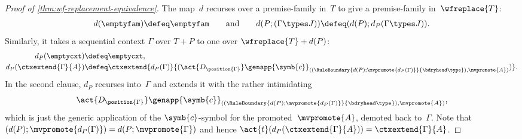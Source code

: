 \begin{proof}[Proof of \cref{thm:wf-replacement-equivalence}]
  The map~$d$ recurses over a premise-family in~$T$ to give a premise-family in~$\wfreplace{T}$:
  \begin{align*}
    d (\emptyfam) \defeq \emptyfam
    \qquad\text{and}\qquad
    d (P ; (\Gamma \types J)) \defeq (d(P) ; d_{P}(\Gamma \types J)).
  \end{align*}
  Similarly, it takes a sequential context $\Gamma$ over $T + P$ to one over $\wfreplace{T} + d(P)$:
  \begin{align*}
    d_P(\emptycxt) &\defeq \emptycxt, \\
    d_P(\ctxextend{\Gamma}{A}) &\defeq
    \ctxextend
      {d_P(\Gamma)}
      {(\act{{D_{\position{\Gamma}}}}
        \genapp{\symb{c}}_{((\RuleBoundary{d(P) ; \mvpromote{d_P(\Gamma)}}{\bdryhead \type}), \mvpromote{A})}
      )}.
  \end{align*}
  In the second clause, $d_P$ recurses into~$\Gamma$ and extends it with the rather intimidating
  \begin{equation*}
    \act{{D_{\position{\Gamma}}}}
        \genapp{\symb{c}}_{((\RuleBoundary{d(P) ; \mvpromote{d_P(\Gamma)}}{\bdryhead \type}), \mvpromote{A})},
  \end{equation*}
  which is just the generic application of the $\symb{c}$-symbol for the promoted~$\mvpromote{A}$, demoted back to~$\Gamma$.
  Note that $(d(P) ; \mvpromote{d_P(\Gamma)}) = d(P ; \mvpromote{\Gamma})$ and hence $\act{t} (d_P(\ctxextend{\Gamma}{A})) = \ctxextend{\Gamma}{A}$.


\end{proof}
